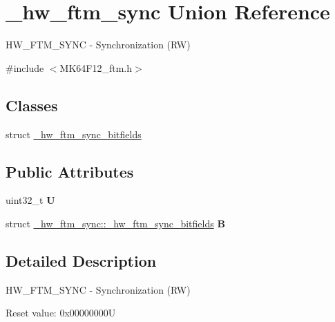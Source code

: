 \hypertarget{union__hw__ftm__sync}{}\section{\+\_\+hw\+\_\+ftm\+\_\+sync Union Reference}
\label{union__hw__ftm__sync}


H\+W\+\_\+\+F\+T\+M\+\_\+\+S\+Y\+NC -\/ Synchronization (RW)  




{\ttfamily \#include $<$M\+K64\+F12\+\_\+ftm.\+h$>$}

\subsection*{Classes}
\begin{DoxyCompactItemize}
\item 
struct \hyperlink{struct__hw__ftm__sync_1_1__hw__ftm__sync__bitfields}{\+\_\+hw\+\_\+ftm\+\_\+sync\+\_\+bitfields}
\end{DoxyCompactItemize}
\subsection*{Public Attributes}
\begin{DoxyCompactItemize}
\item 
uint32\+\_\+t {\bfseries U}\hypertarget{union__hw__ftm__sync_a7d949edacb3fa0fb9657d153cc16de19}{}\label{union__hw__ftm__sync_a7d949edacb3fa0fb9657d153cc16de19}

\item 
struct \hyperlink{struct__hw__ftm__sync_1_1__hw__ftm__sync__bitfields}{\+\_\+hw\+\_\+ftm\+\_\+sync\+::\+\_\+hw\+\_\+ftm\+\_\+sync\+\_\+bitfields} {\bfseries B}\hypertarget{union__hw__ftm__sync_aafaefa2718d144e70aa2491733460dcb}{}\label{union__hw__ftm__sync_aafaefa2718d144e70aa2491733460dcb}

\end{DoxyCompactItemize}


\subsection{Detailed Description}
H\+W\+\_\+\+F\+T\+M\+\_\+\+S\+Y\+NC -\/ Synchronization (RW) 

Reset value\+: 0x00000000U

